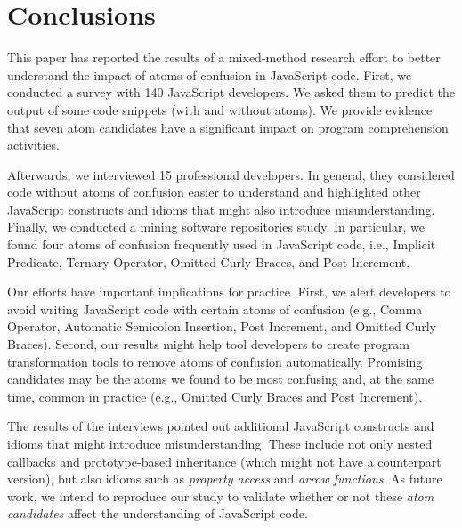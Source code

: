 \section{Conclusions}
\label{conclusion}

This paper has reported the results of a mixed-method research effort to better understand the impact of atoms of confusion in JavaScript code. First, we conducted a survey with 140 JavaScript developers. We asked them to predict the output of some code snippets (with and without atoms). We provide evidence that seven atom candidates have a significant impact on program comprehension activities.

Afterwards, we interviewed 15 professional developers. In general, they considered code without atoms of confusion easier to understand and highlighted other JavaScript constructs and idioms that might also introduce misunderstanding. 
Finally, we conducted a mining software repositories study. In particular, we found four atoms of confusion frequently used in JavaScript code, i.e., Implicit Predicate, Ternary Operator, Omitted Curly Braces, and Post Increment.

Our efforts have important implications for practice. First, we alert developers to avoid writing JavaScript code with certain atoms of confusion (e.g., Comma Operator, Automatic Semicolon Insertion, Post Increment, and Omitted Curly Braces). Second, our results might help tool developers to create program transformation tools to remove atoms of confusion automatically. 
Promising candidates may be the atoms we found to be most confusing and, at the same time, common in practice (e.g., Omitted Curly Braces and Post Increment).

The results of the interviews pointed out additional JavaScript constructs and idioms
that might introduce misunderstanding. These include not only nested callbacks and prototype-based
inheritance (which might not have a counterpart version), but also idioms such
as \emph{property access} and \emph{arrow functions}. As future work, we intend to
reproduce our study to validate whether or not these \emph{atom candidates} affect
the understanding of JavaScript code. 


